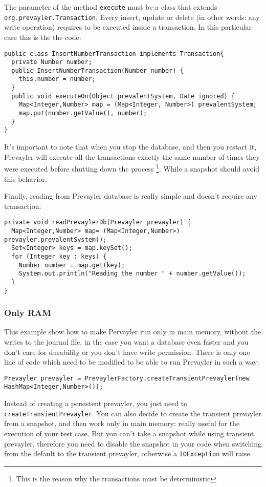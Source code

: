 			The parameter of the method \lstinline!execute! must be a class that extends \lstinline!org.prevayler.Transaction!. 
			Every insert, update or delete (in other words: any write operation) requires to be executed inside a transaction.
			In this particular case this is the the code:			
			\begin{lstlisting} 
public class InsertNumberTransaction implements Transaction{
  private Number number;
  public InsertNumberTransaction(Number number) {
    this.number = number;
  }
  public void executeOn(Object prevalentSystem, Date ignored) {
    Map<Integer,Number> map = (Map<Integer, Number>) prevalentSystem;		
    map.put(number.getValue(), number);		
  }
}			
			\end{lstlisting}

			It's important to note that when you stop the database, and then you restart it, 
			Prevayler will execute all the transactions exactly
	 		the same number of times they were executed before shutting down the process \footnote{This is the reason 
	 		why the transactions must be deterministic}. While a snapshot should avoid this behavior.	
	 		
	 		Finally, reading from Prevayler database is really simple and doesn't require any transaction:
	 		\begin{lstlisting} 
private void readPrevaylerDb(Prevayler prevayler) {
  Map<Integer,Number> map= (Map<Integer,Number>) prevayler.prevalentSystem();
  Set<Integer> keys = map.keySet();
  for (Integer key : keys) {
    Number number = map.get(key);
    System.out.println("Reading the number " + number.getValue());
  }
}		
			\end{lstlisting}
	 		
	 		\subsubsection{Only RAM}
	 		This example show how to make Pervayler run only in main memory, without the writes to the journal file, 
	 		in the case you want a database even faster and you 
	 		don't care for durability or you don't have write permission. There is only one 
	 		line of code which need to be modified to be able to run Prevayler in such a way:	 		
	 		\begin{lstlisting} 
Prevayler prevayler = PrevaylerFactory.createTransientPrevayler(new HashMap<Integer,Number>());
			\end{lstlisting}
			
			Instead of creating a persistent prevayler, you just need to \lstinline!createTransientPrevayler!. 
			You can also decide to create the transient prevayler from a snapshot, and then work only in main memory: 
			really useful for the execution of your test case. But you can't take a snapshot while using 
			transient prevayler, therefore you need to disable the snapshot in your code when switching 
			from the default to the transient prevayler, otherwise a \lstinline!IOException! will raise.

